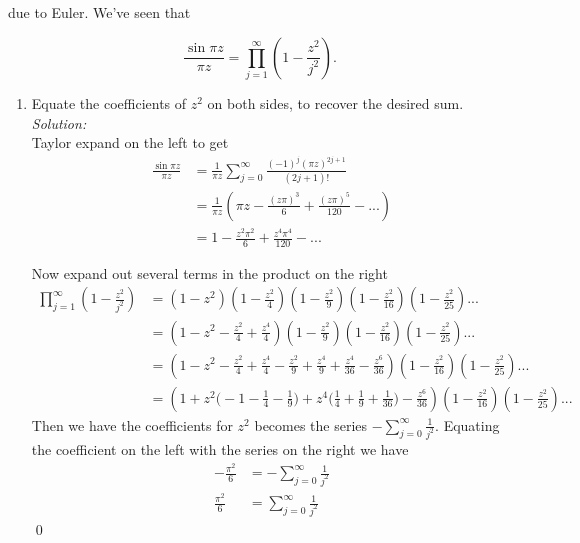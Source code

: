 \documentclass[10pt]{amsart}
\theoremstyle{nonumberplain}
\begin{document}
\begin{enumerate}[label={\bf {\arabic*}:}]
due to Euler. We've seen that

$$
\frac{\sin \pi z}{\pi z} = \prod_{j=1}^{\infty}\left(1-\frac{z^2}{j^2}\right) .
$$

\begin{enumerate}
\item Equate the coefficients of $z^2$ on both sides, to recover the desired sum. \\

\noindent
\textit{Solution:} \\
Taylor expand on the left to get
\begin{align*}
\frac{\sin \pi z}{\pi z} &= \frac 1 {\pi z} \sum_{j=0}^\infty \frac {(-1)^j (\pi z)^{2j + 1}}{(2j + 1)!} \\
	&= \frac 1 {\pi z} \left(\pi z -\frac {(z \pi)^3}{6} + \frac{(z \pi)^5}{120} - ... \right) \\
	&= 1 -\frac {z^2 \pi^2}{6} + \frac{z^4 \pi^4}{120} - ... 
\end{align*}

Now expand out several terms in the product on the right
\begin{align*}
\prod_{j=1}^{\infty}\left(1-\frac{z^2}{j^2}\right)
	&= \left( 1 - z^2\right)\left( 1 - \frac{z^2}{4}\right)\left( 1 - \frac{z^2}{9}\right)\left( 1 - \frac{z^2}{16}\right)\left( 1 - \frac{z^2}{25}\right)... \\
	&= \left( 1 - z^2 - \frac{z^2}{4} + \frac{z^4}{4} \right)\left( 1 - \frac{z^2}{9}\right)\left( 1 - \frac{z^2}{16}\right)\left( 1 - \frac{z^2}{25}\right)... \\
	&= \left( 1 - z^2 - \frac{z^2}{4} + \frac{z^4}{4} - \frac{z^2}{9} + \frac{z^4}{9} + \frac{z^4}{36} -\frac{z^6}{36} \right)\left( 1 - \frac{z^2}{16}\right)\left( 1 - \frac{z^2}{25}\right)... \\
	&= \left( 1 + z^2\Big( -1 - \frac 1 4 - \frac 1 9\Big) + z^4 \Big( \frac 1 {4} + \frac 1 {9} + \frac 1 {36} \Big) - \frac{z^6}{36} \right)\left( 1 - \frac{z^2}{16}\right)\left( 1 - \frac{z^2}{25}\right)...
\end{align*}
Then we have the coefficients for $z^2$ becomes the series $ - \sum_{j = 0}^\infty \frac 1 {j^2}. $
Equating the coefficient on the left with the series on the right we have
\begin{align*}
-\frac {\pi^2} 6 &= - \sum_{j = 0}^\infty \frac 1 {j^2} \\
\frac {\pi^2} 6 &= \sum_{j = 0}^\infty \frac 1 {j^2}
\end{align*} \qed \\


\end{enumerate}
\end{enumerate}
\end{document}
